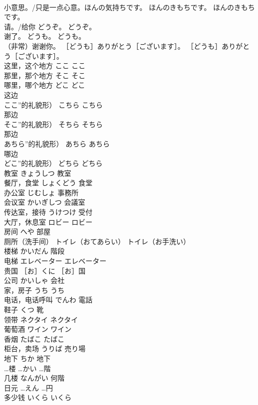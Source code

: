 \documentclass[8pt]{extreport}
\begin{document}
\begin{CJK}{UTF8}{min}
\\	小意思。/只是一点心意。ほんの気持ちです。	ほんのきもちです。	ほんのきもちです。
\\	请。/给你	どうぞ。	どうぞ。
\\	谢了。	どうも。	どうも。
\\	（非常）谢谢你。	［どうも］ありがとう［ございます］。	［どうも］ありがとう［ございます］。
\\	这里，这个地方	ここ	ここ
\\	那里，那个地方	そこ	そこ
\\	哪里，哪个地方	どこ	どこ
\\	这边
\\	ここ”的礼貌形）	こちら	こちら
\\	那边
\\	そこ”的礼貌形）	そちら	そちら
\\	那边
\\	あちら”的礼貌形）	あちら	あちら
\\	哪边
\\	どこ”的礼貌形）	どちら	どちら
\\	教室	きょうしつ	教室
\\	餐厅，食堂	しょくどう	食堂
\\	办公室	じむしょ	事務所
\\	会议室	かいぎしつ	会議室
\\	传达室，接待	うけつけ	受付
\\	大厅，休息室	ロビー	ロビー
\\	房间	へや	部屋
\\	厕所（洗手间）	トイレ（おてあらい）	トイレ（お手洗い）
\\	楼梯	かいだん	階段
\\	电梯	エレベーター	エレベーター
\\	贵国	［お］くに	［お］国
\\	公司	かいしゃ	会社
\\	家，房子	うち	うち
\\	电话，电话呼叫	でんわ	電話
\\	鞋子	くつ	靴
\\	领带	ネクタイ	ネクタイ
\\	葡萄酒	ワイン	ワイン
\\	香烟	たばこ	たばこ
\\	柜台，卖场	うりば	売り場
\\	地下	ちか	地下
\\	…楼	…かい	…階
\\	几楼	なんがい	何階
\\	日元	…えん	…円
\\	多少钱	いくら	いくら

\end{CJK}
\end{document}
